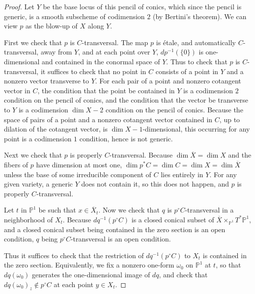 \documentclass[12pt]{amsart}
\theoremstyle{definition}
\theoremstyle{remark}
\begin{document}
\begin{proof}

Let $Y$ be the base locus of this pencil of conics, which since the pencil is generic, is a smooth subscheme of codimension $2$ (by Bertini's theorem). We can view $p$ as the blow-up of $X$ along $Y$.

First we check that $p$ is $C$-transversal. The map $p$  is \'{e}tale, and automatically $C$-transversal, away from $Y$, and at each point over $Y$, $dp^{-1} ( \{0\})$ is one-dimensional and contained in the conormal space of $Y$. Thus to check that $p$ is $C$-transversal, it suffices to check that no point in $C$ consists of a point in $Y$ and a nonzero vector transverse to $Y$.  For each pair of a point and nonzero cotangent vector in $C$, the condition that the point be contained in $Y$ is a codimension $2$ condition on the pencil of conics, and the condition that the vector be transverse to $Y$ is a codimension $\dim X-2$ condition on the pencil of conics. Because the space of pairs of a point and a nonzero cotangent vector contained in $C$, up to dilation of the cotangent vector, is $\dim X-1$-dimensional, this occurring for any point is a codimension $1$ condition, hence is not generic. 


Next we check that $p$ is properly $C$-transversal.  Because $\dim \overline{X} =\dim X$ and the fibers of $p$ have dimension at most one, $\dim p^* C = \dim C = \dim X = \dim \overline{X}$ unless the base of some irreducible component of $C$ lies entirely in $Y$. For any given variety, a generic $Y$ does not contain it, so this does not happen, and $p$ is properly $C$-transversal.

 Let $t$ in $\mathbb P^1$ be such that $x \in \overline{X}_t$. Now we check that $q$ is $p^\circ C$-transversal in a neighborhood of $X_t$.  Because $dq^{-1}  (p^\circ C)$ is a closed conical subset of $ \overline{X} \times_{\mathbb P^1} T^* \mathbb P^1$, and a closed conical subset being contained in the zero section is an open condition, $q$ being $p^\circ C$-transversal is an open condition.
 
 Thus it suffices to check that the restriction of $dq^{-1} (p^\circ C)$ to $X_t$ is contained in the zero section. Equivalently, we fix a nonzero one-form $\omega_0$ on $\mathbb P^1$ at $t$, so that $dq(\omega_0)$ generates the one-dimensional image of $dq$, and check that $dq(\omega_0)_z \notin p^\circ C$ at each point $y\in X_t$. 
 


\end{proof}
\end{document}
